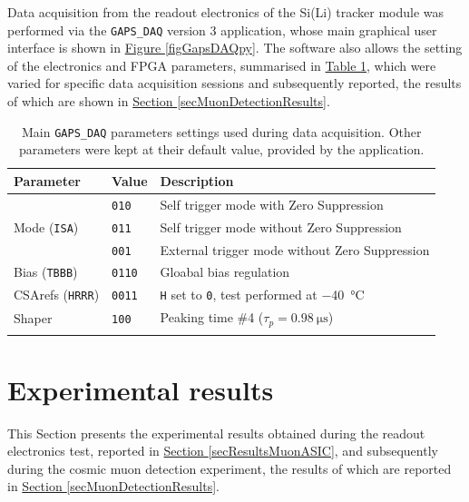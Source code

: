 \par
Data acquisition from the readout electronics of the Si(Li) tracker module was performed via the \texttt{GAPS\_DAQ} version 3 application, whose main graphical user interface is shown in \hyperref[figGapsDAQpy]{Figure \ref{figGapsDAQpy}}. The software also allows the setting of the electronics and FPGA parameters, summarised in \hyperref[tabMuonASICconfig]{Table \ref{tabMuonASICconfig}}, which were varied for specific data acquisition sessions and subsequently reported, the results of which are shown in \hyperref[secMuonDetectionResults]{Section \ref{secMuonDetectionResults}}.

\begin{table}[h!]
    \centering
    \begin{tabular}{l l l} 
         \Xhline{2\arrayrulewidth}
         Parameter & Value & Description \T\B \\
         \hline
         \multirow{3}{*}{Mode (\texttt{ISA})} & \texttt{010} & Self trigger mode with Zero Suppression \T\B \\ & \texttt{011} & Self trigger mode without Zero Suppression \T\B \\ & \texttt{001} & External trigger mode without Zero Suppression \T\B \\
         Bias (\texttt{TBBB}) & \texttt{0110} & Gloabal bias regulation \T\B \\ 
         CSArefs (\texttt{HRRR}) & \texttt{0011} & \texttt{H} set to \texttt{0}, test performed at \SI{-40}{\celsius} \T\B \\ 
         Shaper & \texttt{100} & Peaking time \#4 ($\tau_{p} = \SI{0.98}{\micro\second}$) \T\B \\ 
         \Xhline{2\arrayrulewidth}
    \end{tabular}
    \caption{Main \texttt{GAPS\_DAQ} parameters settings used during data acquisition. Other parameters were kept at their default value, provided by the application.}
    \label{tabMuonASICconfig}
\end{table}



\section{Experimental results}
This Section presents the experimental results obtained during the readout electronics test, reported in \hyperref[secResultsMuonASIC]{Section \ref{secResultsMuonASIC}}, and subsequently during the cosmic muon detection experiment, the results of which are reported in \hyperref[secMuonDetectionResults]{Section \ref{secMuonDetectionResults}}.

